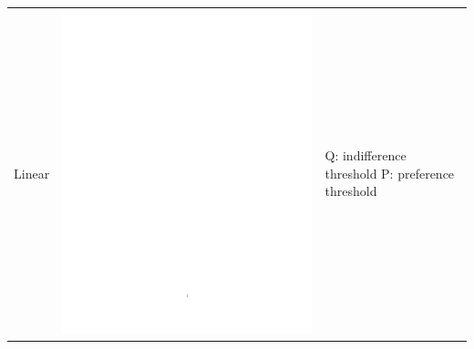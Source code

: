 \begin{enumerate}
\begin{table}[h!]
\begin{center}
\begin{tabular}{|l|c|b{4.2cm}|}
\hline Linear & \includegraphics[page=2,trim=7.5cm 13.8cm 3.5cm 6.5cm,clip,scale=0.36]{prom_linear_pdf} & Q: indifference threshold \newline P: preference threshold\\

\end{tabular}
\end{center}
\end{table}
\end{enumerate}
